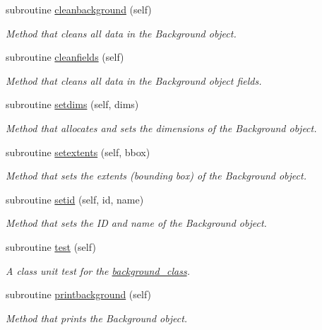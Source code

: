 \begin{DoxyCompactItemize}
subroutine \mbox{\hyperlink{namespacebackground__mod_a1610fcc9ce260beb3c35418e92a63391}{cleanbackground}} (self)
\begin{DoxyCompactList}\small\item\em Method that cleans all data in the Background object. \end{DoxyCompactList}\item 
subroutine \mbox{\hyperlink{namespacebackground__mod_a843a471a68ce83809e3ed0a40886a4e7}{cleanfields}} (self)
\begin{DoxyCompactList}\small\item\em Method that cleans all data in the Background object fields. \end{DoxyCompactList}\item 
subroutine \mbox{\hyperlink{namespacebackground__mod_a06d96d4627391d74feb105a842a87dc0}{setdims}} (self, dims)
\begin{DoxyCompactList}\small\item\em Method that allocates and sets the dimensions of the Background object. \end{DoxyCompactList}\item 
subroutine \mbox{\hyperlink{namespacebackground__mod_ae8871564866fdd657a25f6a5a2256c33}{setextents}} (self, bbox)
\begin{DoxyCompactList}\small\item\em Method that sets the extents (bounding box) of the Background object. \end{DoxyCompactList}\item 
subroutine \mbox{\hyperlink{namespacebackground__mod_a4feaccf688558d8590ece4f09c65c977}{setid}} (self, id, name)
\begin{DoxyCompactList}\small\item\em Method that sets the ID and name of the Background object. \end{DoxyCompactList}\item 
subroutine \mbox{\hyperlink{namespacebackground__mod_a3cee95b9b5d3aae83df33334981f2b27}{test}} (self)
\begin{DoxyCompactList}\small\item\em A class \textquotesingle{}unit\textquotesingle{} test for the \mbox{\hyperlink{structbackground__mod_1_1background__class}{background\+\_\+class}}. \end{DoxyCompactList}\item 
subroutine \mbox{\hyperlink{namespacebackground__mod_a8a8f225cffcddb742f22a402155b703f}{printbackground}} (self)
\begin{DoxyCompactList}\small\item\em Method that prints the Background object. \end{DoxyCompactList}\item 

\end{DoxyCompactItemize}
